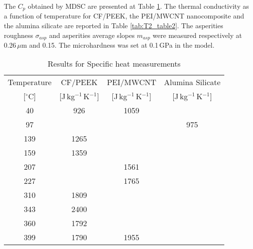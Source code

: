 The $C_p$ obtained by MDSC are presented at Table \ref{tab:T2_table1}. 
The thermal conductivity as a function of temperature for CF/PEEK, the PEI/MWCNT nanocomposite and the alumina silicate are reported in Table \ref{tab:T2_table2}. 
The asperities roughness $\sigma_{asp}$ and asperities average slopes $m_{asp}$ were measured respectively at \mbox{0.26\,$\mu$m} and 0.15. 
The microhardness was set at \mbox{0.1\,GPa} in the model. 

\begin{table}[ht]
	\centering
	\begin{tabular}{@{}cccc@{}}
		\toprule
		   Temperature    &           CF/PEEK            &          PEI/MWCNT           &       Alumina Silicate       \\
		{[}$^{\circ}$C{]} & {[}J\,kg$^{-1}$\,K$^{-1}${]} & {[}J\,kg$^{-1}$\,K$^{-1}${]} & {[}J\,kg$^{-1}$\,K$^{-1}${]} \\ \midrule
		       40         &             926              &             1059             &                              \\
		       97         &                              &                              &             975              \\
		       139        &             1265             &                              &                              \\
		       159        &             1359             &                              &                              \\
		       207        &                              &             1561             &                              \\
		       227        &                              &             1765             &                              \\
		       310        &             1809             &                              &                              \\
		       343        &             2400             &                              &                              \\
		       360        &             1792             &                              &                              \\
		       399        &             1790             &             1955             &                              \\ \bottomrule
	\end{tabular}
	\caption{Results for Specific heat measurements}
	\label{tab:T2_table1}
\end{table}

